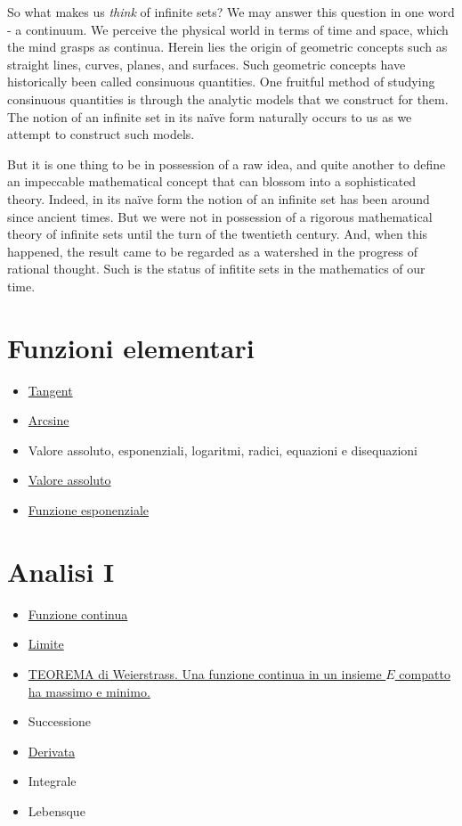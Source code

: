 So what makes us \emph{think} of infinite sets? We may answer this question in one word - a continuum. We perceive the physical world in terms of time and space, which the mind grasps as continua. Herein lies the origin of geometric concepts such as straight lines, curves, planes, and surfaces. Such geometric concepts have historically been called consinuous quantities. One fruitful method of studying consinuous quantities is through the analytic models that we construct for them. The notion of an infinite set in its na\"ive form naturally occurs to us as we attempt to construct such models.

But it is one thing to be in possession of a raw idea, and quite another to define an impeccable mathematical concept that can blossom into a sophisticated theory. Indeed, in its na\"ive form the notion of an infinite set has been around since ancient times. But we were not in possession of a rigorous mathematical theory of infinite sets until the turn of the twentieth century. And, when this happened, the result came to be regarded as a watershed in the progress of rational thought. Such is the status of infitite sets in the mathematics of our time.

\section*{Funzioni elementari}
\begin{itemize}
 \item \href{Tangent.pdf}{Tangent}
 \item \href{Arcsine.pdf}{Arcsine}
 \item Valore assoluto, esponenziali, logaritmi, radici, equazioni e disequazioni
 \item \href{./ValoreAssoluto.pdf}{Valore assoluto}
 \item \href{./FunzioneEsponenziale.pdf}{Funzione esponenziale} 
\end{itemize}

\section{Analisi I}
\begin{itemize}
 \item \href{FunzioneContinua.pdf}{Funzione continua}
 \item \href{Limite.pdf}{Limite}
 \item \href{Weierstrass.pdf}{TEOREMA di Weierstrass. Una funzione continua in un insieme $E$ compatto ha massimo e minimo.}
 \item Successione
 \item \href{Derivata.pdf}{Derivata} 
 \item Integrale
 \item Lebensque
\end{itemize}

